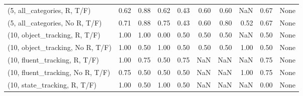 \begin{table*}[h!]
\begin{adjustbox}{width=2\columnwidth,center}
\begin{tabular}{lrrr|rrr|rrr}
(5, all\_categories, R, T/F)          &                      0.62 &                  0.88 &                      0.62 &                          0.43 &                      0.60 &                          0.60 &                                    NaN &                               0.67 &                                  None \\
(5, all\_categories, No R, T/F)       &                      0.71 &                  0.88 &                      0.75 &                          0.43 &                      0.60 &                          0.80 &                                   0.52 &                               0.67 &                                  None \\



\midrule
(10, object\_tracking, R, T/F)         &                      1.00 &                  1.00 &                      0.00 &                          0.50 &                      0.50 &                          0.50 &                                    NaN &                               0.50 &                                  None \\
(10, object\_tracking, No R, T/F)      &                      1.00 &                  0.50 &                      1.00 &                          0.50 &                      0.50 &                          0.50 &                                   1.00 &                               0.50 &                                  None \\
(10, fluent\_tracking, R, T/F)         &                      1.00 &                  0.75 &                      0.50 &                          0.75 &                       NaN &                           NaN &                                    NaN &                               0.75 &                                  None \\
(10, fluent\_tracking, No R, T/F)      &                      0.75 &                  0.50 &                      0.50 &                          0.50 &                       NaN &                           NaN &                                   1.00 &                               0.75 &                                  None \\
(10, state\_tracking, R, T/F)          &                      1.00 &                  0.50 &                      1.00 &                          0.50 &                       NaN &                           NaN &                                    NaN &                               0.00 &                                  None \\

\end{tabular}
\end{adjustbox}
\end{table*}
